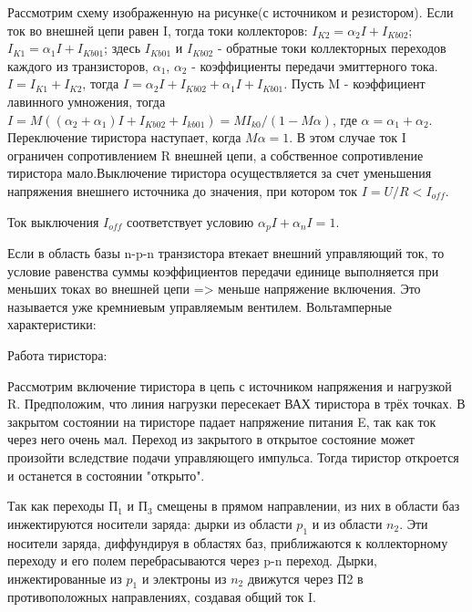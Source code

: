 Рассмотрим схему изображенную на рисунке(с источником и резистором). Если ток во внешней цепи равен I, тогда токи коллекторов:
$I_{K2} = \alpha_2I+I_{Kb02}$; $I_{K1} = \alpha_1I+I_{Kb01}$;
здесь $I_{Kb01}$ и $I_{Kb02}$ - обратные токи коллекторных переходов каждого из транзисторов, $\alpha_1$, $\alpha_2$ - коэффициенты передачи эмиттерного тока. $I = I_{K1}+I_{K2}$, тогда  $I = \alpha_2I+I_{Kb02}+\alpha_1I+I_{Kb01}$.
Пусть M - коэффициент лавинного умножения, тогда $I = M( (\alpha_2+\alpha_1)I+I_{Kb02}+I_{kb01}) = MI_{k0}/(1-M\alpha) $, где $\alpha = \alpha_1+\alpha_2$. Переключение тиристора наступает, когда $M\alpha = 1$. В этом случае ток I ограничен сопротивлением R внешней цепи, а собственное сопротивление тиристора мало.Выключение тиристора осуществляется за счет уменьшения напряжения внешнего источника до значения, при котором ток $I=U/R < I_{off}$.

Ток выключения $I_{off}$ соответствует условию $\alpha_pI + \alpha_nI = 1$.

Если в область базы n-p-n транзистора втекает внешний управляющий ток, то условие равенства суммы коэффициентов передачи единице выполняется при меньших токах во внешней цепи => меньше напряжение включения. Это называется уже кремниевым управляемым вентилем. Вольтамперные характеристики:

\begin{center}
	\begin{figure}[h!]
		\caption{}	
	\end{figure}
\end{center}

Работа тиристора:
\begin{center}
	\begin{figure}[h!]
		\caption{}	
	\end{figure}
\end{center}

Рассмотрим включение тиристора в цепь с источником напряжения и нагрузкой R. Предположим, что линия нагрузки пересекает ВАХ тиристора в трёх точках. В закрытом состоянии на тиристоре падает напряжение питания E, так как ток через него очень мал. Переход из закрытого в открытое состояние может произойти вследствие подачи управляющего импульса. Тогда тиристор откроется и останется в состоянии "открыто".

Так как переходы П$_1$ и П$_3$ смещены в прямом направлении, из них в области баз инжектируются носители заряда: дырки из области $p_1$ и  из области $n_2$. Эти носители заряда, диффундируя в областях баз, приближаются к коллекторному переходу и его полем перебрасываются через p-n переход. Дырки, инжектированные из $p_1$ и электроны из $n_2$ движутся через П2 в противоположных направлениях, создавая общий ток I.


